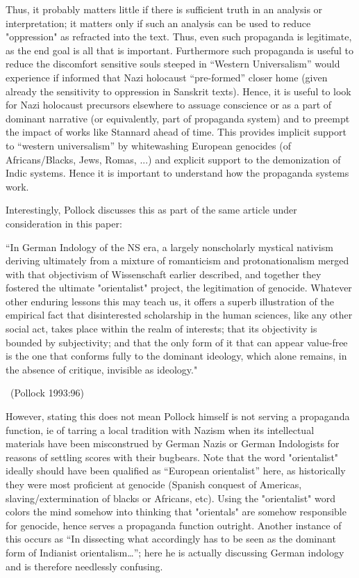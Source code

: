 Thus, it probably matters little if there is sufficient truth in an analysis or interpretation; it matters only if such an analysis can be used to reduce "oppression" as refracted into the text. Thus, even such propaganda is legitimate, as the end goal is all that is important. Furthermore such propaganda is useful to reduce the discomfort sensitive souls steeped in “Western Universalism” would experience if informed that Nazi holocaust “pre-formed” closer home (given already the sensitivity to oppression in Sanskrit texts). Hence, it is useful to look for Nazi holocaust precursors elsewhere to assuage conscience or as a part of dominant narrative (or equivalently, part of propaganda system) and to preempt the impact of works like Stannard ahead of time. This provides implicit support to “western universalism” by whitewashing European genocides (of Africans/Blacks, Jews, Romas, ...)  and explicit support to the demonization of Indic systems. Hence it is important to understand how the propaganda systems work.
\smallskip

Interestingly, Pollock discusses this as part of the same article under consideration in this paper: 

\begin{myquote}
“In German Indology of the NS era, a largely nonscholarly mystical nativism deriving ultimately from a mixture of romanticism and protonationalism merged with that objectivism of Wissenschaft earlier described, and together they fostered the ultimate "orientalist" project, the legitimation of genocide. Whatever other enduring lessons this may teach us, it offers a superb illustration of the empirical fact that disinterested scholarship in the human sciences, like any other social act, takes place within the realm of interests; that its objectivity is bounded by subjectivity; and that the only form of it that can appear value-free is the one that conforms fully to the dominant ideology, which alone remains, in the absence of critique, invisible as ideology."

~\hfill(Pollock 1993:96)
\end{myquote}

However, stating this does not mean Pollock himself is not serving a propaganda function, ie of tarring a local tradition with Nazism when its intellectual materials have been misconstrued by German Nazis or German Indologists for reasons of settling scores with their bugbears. Note that the word "orientalist" ideally should have been qualified as “European orientalist” here, as historically they were most proficient at genocide (Spanish conquest of Americas, slaving/extermination of blacks or Africans, etc). Using the "orientalist" word colors the mind somehow into thinking that "orientals" are somehow responsible for genocide, hence serves a propaganda function outright. Another instance of this occurs as “In dissecting what accordingly has to be seen as the dominant form of Indianist orientalism…”; here he is actually discussing German indology and is therefore needlessly confusing.

